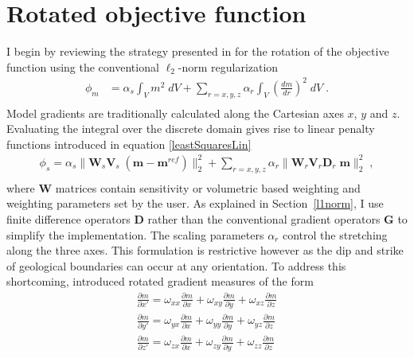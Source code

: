\section{Rotated objective function}
I begin by reviewing the strategy presented in \cite{LiDWO2000} for the rotation of the objective function using the conventional $\ell_2$-norm regularization
\begin{equation}\label{integralReg}
\begin{split}
\phi_m &= \alpha_s \int_V m^2 \;dV + \sum_{r=x,y,z} \alpha_r \int_V \left( \frac{d m}{dr}\right)^2 \;dV\;. \\
\end{split}
\end{equation}
Model gradients are traditionally calculated along the Cartesian axes $x$, $y$ and $z$. Evaluating the integral over the discrete domain gives rise to linear penalty functions introduced in equation \eqref{leastSquaresLin}
\begin{equation}
\begin{split}
\phi_s = \alpha_s \|\mathbf{W}_s \mathbf{V}_s\;(\mathbf{m}-\mathbf{m}^{ref})\|_2^2 + \sum_{r=x,y,z} \alpha_r \|\mathbf{W}_r \mathbf{V}_r \mathbf{D}_r \;\mathbf{m}\|_2^2 \;,\\
\end{split}
\end{equation}
where $\mathbf{W}$ matrices contain sensitivity or volumetric based weighting and weighting parameters set by the user. As explained in Section~\ref{l1norm}, I use finite difference operators $\mathbf{D}$ rather than the conventional gradient operators $\mathbf{G}$ to simplify the implementation.
The scaling parameters $\alpha_r$ control the stretching along the three axes. This formulation is restrictive however as the dip and strike of geological boundaries can occur at any orientation. To address this shortcoming, \cite{LiDWO2000} introduced rotated gradient measures of the form
\begin{equation}\label{RotGradients}
\begin{split}
\frac{\partial m}{\partial x'} = \omega_{xx} \frac{\partial m}{\partial x} + \omega_{xy} \frac{\partial m}{\partial y} + \omega_{xz} \frac{\partial m}{\partial z} \\
\frac{\partial m}{\partial y'} = \omega_{yx} \frac{\partial m}{\partial x} + \omega_{yy} \frac{\partial m}{\partial y} + \omega_{yz} \frac{\partial m}{\partial z} \\
\frac{\partial m}{\partial z'} = \omega_{zx} \frac{\partial m}{\partial x} + \omega_{zy} \frac{\partial m}{\partial y} + \omega_{zz} \frac{\partial m}{\partial z}
\end{split}
\end{equation}
